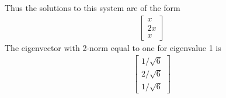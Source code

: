 \documentclass[11pt]{article}
\begin{document}
\begin{enumerate}
\begin{enumerate}
                Thus the solutions to this system are of the form
                \begin{align*}
                    \begin{bmatrix}
                        x \\
                        2x \\
                        x
                    \end{bmatrix}
                \end{align*}
                The eigenvector with 2-norm equal to one for eigenvalue 1 is
                \begin{align*}
                    \begin{bmatrix}
                        1/\sqrt{6} \\
                        2/\sqrt{6} \\
                        1/\sqrt{6}
                    \end{bmatrix}
                \end{align*}


\end{enumerate}
\end{enumerate}
\end{document}
